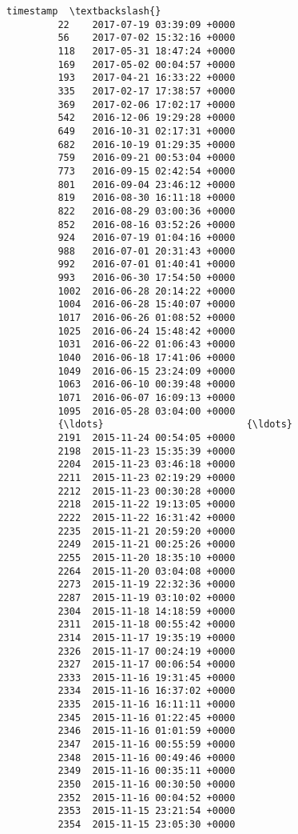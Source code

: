 \documentclass[11pt]{article}
\begin{document}
\begin{Verbatim}[commandchars=\\\{\}]
                               timestamp  \textbackslash{}
         22    2017-07-19 03:39:09 +0000   
         56    2017-07-02 15:32:16 +0000   
         118   2017-05-31 18:47:24 +0000   
         169   2017-05-02 00:04:57 +0000   
         193   2017-04-21 16:33:22 +0000   
         335   2017-02-17 17:38:57 +0000   
         369   2017-02-06 17:02:17 +0000   
         542   2016-12-06 19:29:28 +0000   
         649   2016-10-31 02:17:31 +0000   
         682   2016-10-19 01:29:35 +0000   
         759   2016-09-21 00:53:04 +0000   
         773   2016-09-15 02:42:54 +0000   
         801   2016-09-04 23:46:12 +0000   
         819   2016-08-30 16:11:18 +0000   
         822   2016-08-29 03:00:36 +0000   
         852   2016-08-16 03:52:26 +0000   
         924   2016-07-19 01:04:16 +0000   
         988   2016-07-01 20:31:43 +0000   
         992   2016-07-01 01:40:41 +0000   
         993   2016-06-30 17:54:50 +0000   
         1002  2016-06-28 20:14:22 +0000   
         1004  2016-06-28 15:40:07 +0000   
         1017  2016-06-26 01:08:52 +0000   
         1025  2016-06-24 15:48:42 +0000   
         1031  2016-06-22 01:06:43 +0000   
         1040  2016-06-18 17:41:06 +0000   
         1049  2016-06-15 23:24:09 +0000   
         1063  2016-06-10 00:39:48 +0000   
         1071  2016-06-07 16:09:13 +0000   
         1095  2016-05-28 03:04:00 +0000   
         {\ldots}                         {\ldots}   
         2191  2015-11-24 00:54:05 +0000   
         2198  2015-11-23 15:35:39 +0000   
         2204  2015-11-23 03:46:18 +0000   
         2211  2015-11-23 02:19:29 +0000   
         2212  2015-11-23 00:30:28 +0000   
         2218  2015-11-22 19:13:05 +0000   
         2222  2015-11-22 16:31:42 +0000   
         2235  2015-11-21 20:59:20 +0000   
         2249  2015-11-21 00:25:26 +0000   
         2255  2015-11-20 18:35:10 +0000   
         2264  2015-11-20 03:04:08 +0000   
         2273  2015-11-19 22:32:36 +0000   
         2287  2015-11-19 03:10:02 +0000   
         2304  2015-11-18 14:18:59 +0000   
         2311  2015-11-18 00:55:42 +0000   
         2314  2015-11-17 19:35:19 +0000   
         2326  2015-11-17 00:24:19 +0000   
         2327  2015-11-17 00:06:54 +0000   
         2333  2015-11-16 19:31:45 +0000   
         2334  2015-11-16 16:37:02 +0000   
         2335  2015-11-16 16:11:11 +0000   
         2345  2015-11-16 01:22:45 +0000   
         2346  2015-11-16 01:01:59 +0000   
         2347  2015-11-16 00:55:59 +0000   
         2348  2015-11-16 00:49:46 +0000   
         2349  2015-11-16 00:35:11 +0000   
         2350  2015-11-16 00:30:50 +0000   
         2352  2015-11-16 00:04:52 +0000   
         2353  2015-11-15 23:21:54 +0000   
         2354  2015-11-15 23:05:30 +0000   
         

\end{Verbatim}
\end{document}
